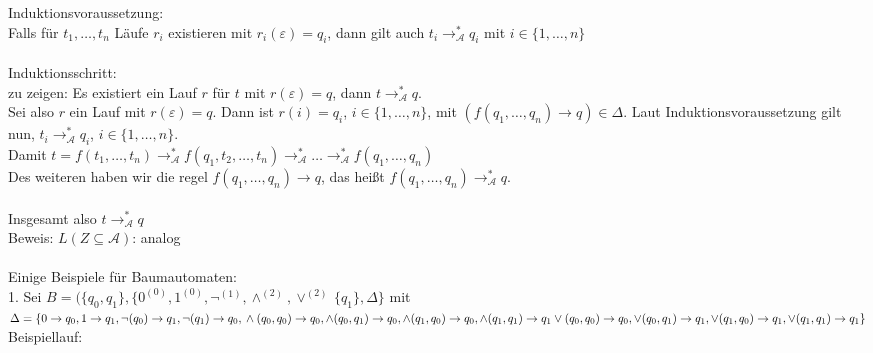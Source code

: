 \documentclass[titlepage]{article}
\begin{document}
Induktionsvoraussetzung:\\
Falls f\"ur $t_1, \dots , t_n$ L\"aufe $r_i$ existieren mit $r_i(\varepsilon) = q_i$, dann gilt auch $t_i \rightarrow ^\ast_{\mathcal{A}} q_i$ mit $i\in \{1, \dots , n\}$\\ \\

Induktionsschritt:\\
zu zeigen: Es existiert ein Lauf $r$ f\"ur $t$ mit $r(\varepsilon) = q$, dann $t \rightarrow ^\ast_\mathcal{A} q$.\\
Sei also $r$ ein Lauf mit $r(\varepsilon) = q$. Dann ist $r(i) = q_i$, $i \in \{1, \dots, n\}$, mit
$(f(q_1, \dots, q_n) \rightarrow q) \in \Delta$. Laut Induktionsvoraussetzung gilt nun,
$t_i \rightarrow ^\ast_\mathcal{A} q_i$, $i \in \{1, \dots, n\}$.\\
Damit $t = f(t_1, \dots, t_n) 
\rightarrow ^\ast_\mathcal{A} f(q_1, t_2, \dots, t_n)
\rightarrow ^\ast_\mathcal{A} \dots
\rightarrow ^\ast_\mathcal{A} f(q_1, \dots, q_n)$\\
Des weiteren haben wir die regel $f(q_1, \dots, q_n) \rightarrow q$, das hei\ss t $f(q_1, \dots, q_n) \rightarrow ^\ast_\mathcal{A} q$.\\ \\

Insgesamt also $t \rightarrow ^\ast_\mathcal{A} q$ \\

Beweis: \glqq$L(Z \subseteq \mathcal{A})$\grqq: analog\\ \\

Einige Beispiele f\"ur Baumautomaten:\\

1. Sei $B = (\{q_0, q_1\}, \{0^{(0)},1^{(0)},\lnot^{(1)},\land^{(2)},\lor^{(2)}\,\{q_1\},\Delta\}$ mit\\
$\Delta = \{ 0 \rightarrow q_0, 1 \rightarrow q_1,\\
\lnot (q_0) \rightarrow q_1, \lnot (q_1) \rightarrow q_0,\\
\land (q_0, q_0) \rightarrow q_0, \land (q_0, q_1) \rightarrow q_0, \land (q_1, q_0) \rightarrow q_0, \land (q_1, q_1) \rightarrow q_1\\
\lor (q_0, q_0) \rightarrow q_0, \lor (q_0, q_1) \rightarrow q_1, \lor (q_1, q_0) \rightarrow q_1, \lor (q_1, q_1) \rightarrow q_1\}$\\

Beispiellauf:\\
\end{document}
